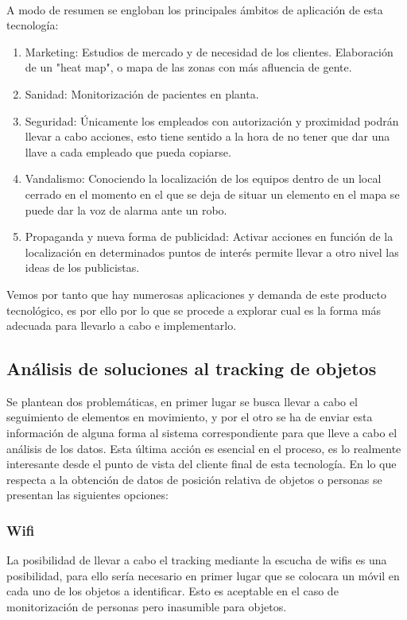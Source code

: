 \documentclass[a4paper ,12pt, onecolumn]{article}
\begin{document}
        \paragraph{}
        A modo de resumen se engloban los principales ámbitos de aplicación de esta tecnología:
        \begin{enumerate}
            \item Marketing: Estudios de mercado y de necesidad de los clientes. Elaboración de un "heat map", o mapa 
            de las zonas con más afluencia de gente.
            \item Sanidad: Monitorización de pacientes en planta. 
            \item Seguridad: Únicamente los empleados con autorización y proximidad podrán llevar a cabo acciones,
            esto tiene sentido a la hora de no tener que dar una llave a cada empleado que pueda copiarse.
            \item Vandalismo: Conociendo la localización de los equipos dentro de un local cerrado en el momento 
            en el que se deja de situar un elemento en el mapa se puede dar la voz de alarma ante un robo.
            \item Propaganda y nueva forma de publicidad: Activar acciones en función de la localización en determinados
            puntos de interés permite llevar a otro nivel las ideas de los publicistas.
        \end{enumerate}
        Vemos por tanto que hay numerosas aplicaciones y demanda de este producto tecnológico, es por ello por lo que se 
        procede a explorar cual es la forma más adecuada para llevarlo a cabo e implementarlo.
    \subsection{Análisis de soluciones al tracking de objetos}
        Se plantean dos problemáticas, en primer lugar se busca llevar a cabo el seguimiento de elementos en movimiento, y por el otro 
        se ha de enviar esta información de alguna forma al sistema correspondiente para que lleve a cabo el análisis de los datos. Esta
        última acción es esencial en el proceso, es lo realmente interesante desde el punto de vista del cliente final de esta tecnología.
        En lo que respecta a la obtención de datos de posición relativa de objetos o personas se presentan las siguientes opciones:
        \subsubsection {Wifi}
            La posibilidad de llevar a cabo el tracking mediante la escucha de wifis es una posibilidad, para ello sería
            necesario en primer lugar que se colocara un móvil en cada uno de los objetos a identificar. Esto es aceptable 
            en el caso de monitorización de personas pero inasumible para objetos.
\end{document}
